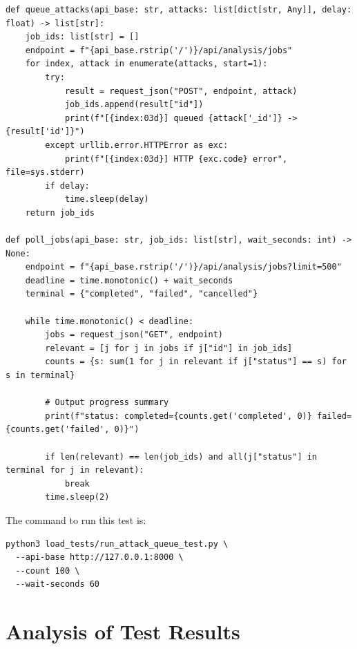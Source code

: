 \documentclass[12pt,a4paper]{report}
\begin{document}
\begin{lstlisting}[style=pythonstyle, caption={HTTP POST and polling logic in load\_tests/run\_attack\_queue\_test.py}]
def queue_attacks(api_base: str, attacks: list[dict[str, Any]], delay: float) -> list[str]:
    job_ids: list[str] = []
    endpoint = f"{api_base.rstrip('/')}/api/analysis/jobs"
    for index, attack in enumerate(attacks, start=1):
        try:
            result = request_json("POST", endpoint, attack)
            job_ids.append(result["id"])
            print(f"[{index:03d}] queued {attack['_id']} -> {result['id']}")
        except urllib.error.HTTPError as exc:
            print(f"[{index:03d}] HTTP {exc.code} error", file=sys.stderr)
        if delay:
            time.sleep(delay)
    return job_ids

def poll_jobs(api_base: str, job_ids: list[str], wait_seconds: int) -> None:
    endpoint = f"{api_base.rstrip('/')}/api/analysis/jobs?limit=500"
    deadline = time.monotonic() + wait_seconds
    terminal = {"completed", "failed", "cancelled"}

    while time.monotonic() < deadline:
        jobs = request_json("GET", endpoint)
        relevant = [j for j in jobs if j["id"] in job_ids]
        counts = {s: sum(1 for j in relevant if j["status"] == s) for s in terminal}
        
        # Output progress summary
        print(f"status: completed={counts.get('completed', 0)} failed={counts.get('failed', 0)}")
        
        if len(relevant) == len(job_ids) and all(j["status"] in terminal for j in relevant):
            break
        time.sleep(2)
\end{lstlisting}

The command to run this test is:
\begin{lstlisting}[style=bashstyle, caption={Running the attack request test utility}]
python3 load_tests/run_attack_queue_test.py \
  --api-base http://127.0.0.1:8000 \
  --count 100 \
  --wait-seconds 60
\end{lstlisting}

\section{Analysis of Test Results}
\end{document}
